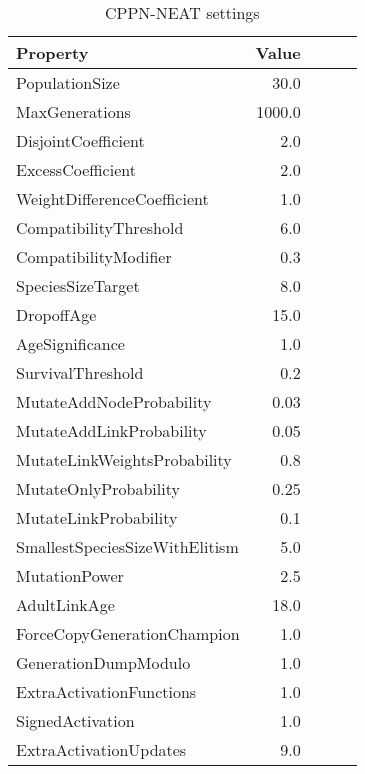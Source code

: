 \begin{table}[ht!]
\centering
\caption{CPPN-NEAT settings}
\label{EvolutionSettingsTable}
    \begin{tabular}{lrrrr}
    \toprule
    \textbf{Property} &  \textbf{Value}\\
    \midrule
    PopulationSize & 30.0\\
    MaxGenerations & 1000.0\\
    DisjointCoefficient & 2.0 \\
    ExcessCoefficient & 2.0 \\
    WeightDifferenceCoefficient & 1.0 \\
    CompatibilityThreshold & 6.0 \\
    CompatibilityModifier & 0.3 \\
    SpeciesSizeTarget & 8.0 \\
    DropoffAge & 15.0 \\
    AgeSignificance &	1.0 \\
    SurvivalThreshold & 0.2 \\
    MutateAddNodeProbability & 0.03 \\
    MutateAddLinkProbability & 0.05 \\
    MutateLinkWeightsProbability & 0.8 \\
    MutateOnlyProbability & 0.25 \\
    MutateLinkProbability & 0.1 \\
    SmallestSpeciesSizeWithElitism & 5.0 \\
    MutationPower & 2.5 \\
    AdultLinkAge & 18.0 \\
    ForceCopyGenerationChampion & 1.0 \\
    GenerationDumpModulo & 1.0 \\
    ExtraActivationFunctions & 1.0 \\
    SignedActivation & 1.0 \\
    ExtraActivationUpdates & 9.0 \\
    \bottomrule
    \end{tabular}
\end{table}








